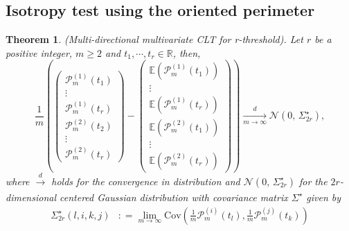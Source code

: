 \documentclass[12pt]{article}
\theoremstyle{Theorem}
\newtheorem{Theorem}{Theorem}[section]
\begin{document}
\subsection{Isotropy test using the oriented perimeter}
\begin{Theorem}(Multi-directional multivariate CLT for r-threshold). Let $r$ be a positive integer, $m \geq 2$ and $t_{1}, \cdots,t_{r} \in \mathbb{R}$, then, 
\begin{equation*}
\frac{1}{m}\left(\begin{pmatrix} \mathcal{P}^{\scriptscriptstyle (1)}_{m}(t_{1}) \\  \vdots \\ \mathcal{P}^{\scriptscriptstyle (1)}_{m}(t_{r}) \\ \mathcal{P}^{\scriptscriptstyle (2)}_{m}(t_{2}) \\  \vdots \\ \mathcal{P}^{\scriptscriptstyle (2)}_{m}(t_{r})  \end{pmatrix} - \begin{pmatrix} \mathbb{E}(\mathcal{P}^{\scriptscriptstyle (1)}_{m}(t_{1}))  \\ \vdots \\ \mathbb{E}(\mathcal{P}^{\scriptscriptstyle (1)}_{m}(t_{r}))\\\mathbb{E}(\mathcal{P}^{\scriptscriptstyle (2)}_{m}(t_{1})) \\ \vdots \\ \mathbb{E}(\mathcal{P}^{\scriptscriptstyle (2)}_{m}(t_{r})) \end{pmatrix}\right) \xrightarrow[m \to \infty]{d} \mathcal{N}\left(0,\,\Sigma_{2r}^{\star}\right),
\end{equation*}
where $\xrightarrow[]{d}$ holds for the convergence in distribution and $\mathcal{N}\left(0,\,\Sigma_{2r}^{\star}\right)$ for the $2r$-dimensional centered Gaussian distribution with covariance matrix $\Sigma^\star$ given by
\begin{align*}
\Sigma^{\star}_{2r}(l,i,k,j) & : = \lim_{m \to \infty}\text{Cov}\left(\frac{1}{m}\mathcal{P}^{\scriptscriptstyle (i)}_{m}(t_{l}),  \frac{1}{m}\mathcal{P}^{\scriptscriptstyle (j)}_{m}(t_{k}) \right)
\end{align*}
\end{Theorem}
\end{document}
